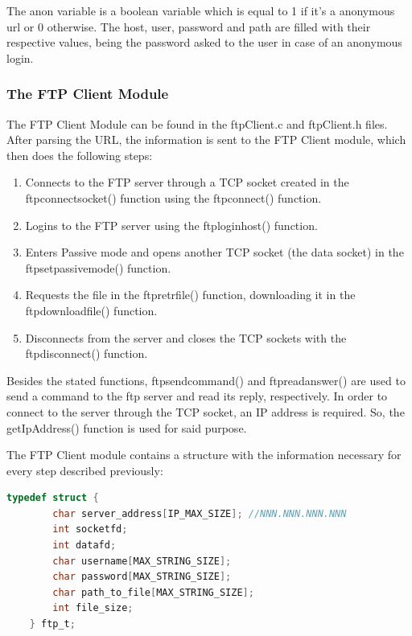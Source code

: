 \documentclass[11pt,a4paper,reqno]{article}
\numberwithin{equation}{section}
\begin{document}
	The anon variable is a boolean variable which is equal to 1 if it’s a anonymous url or 0 otherwise. The host, user, password and path are filled with their respective values, being the password asked to the user in case of an anonymous login.

	\subsubsection{The FTP Client Module}

	The FTP Client Module can be found in the ftpClient.c and ftpClient.h files. After parsing the URL, the information is sent to the FTP Client module, which then does the following steps:

	\begin{enumerate}
		\item Connects to the FTP server through a TCP socket created in the ftp\textunderscore connect\textunderscore socket() function using the ftp\textunderscore connect() function.
		\item Logins to the FTP server using the ftp\textunderscore login\textunderscore host() function.
		\item Enters Passive mode and opens another TCP socket (the data socket) in the ftp\textunderscore set\textunderscore passive\textunderscore mode() function.
		\item Requests the file in the ftp\textunderscore retr\textunderscore file() function, downloading it in the ftp\textunderscore download\textunderscore file() function.
		\item Disconnects from the server and closes the TCP sockets with the ftp\textunderscore disconnect() function.
	\end{enumerate}

	Besides the stated functions, ftp\textunderscore send\textunderscore command() and ftp\textunderscore read\textunderscore answer() are used to send a command to the ftp server and read its reply, respectively. In order to connect to the server through the TCP socket, an IP address is required. So, the getIpAddress() function is used for said purpose.

	The FTP Client module contains a structure with the information necessary for every step described previously:

	\begin{lstlisting}[language=C, breaklines=true]
	typedef struct {
		char server_address[IP_MAX_SIZE]; //NNN.NNN.NNN.NNN
		int socketfd;
		int datafd;
		char username[MAX_STRING_SIZE];
		char password[MAX_STRING_SIZE];
		char path_to_file[MAX_STRING_SIZE];
		int file_size;
	} ftp_t;
	\end{lstlisting}
\end{document}
